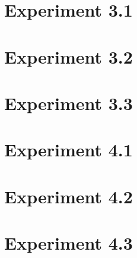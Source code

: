 \section*{Experiment 3.1}

\clearpage
\section*{Experiment 3.2}

\clearpage
\section*{Experiment 3.3}

\clearpage


\section*{Experiment 4.1}

\clearpage
\section*{Experiment 4.2}

\clearpage
\section*{Experiment 4.3}

\clearpage



